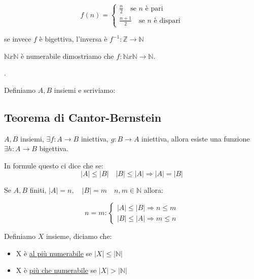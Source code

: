 \documentclass{article}
\begin{document}
\[
f(n) =
\begin{cases}
        \frac{n}{2} \quad \mbox{se $n$ è pari} \\
        \frac{n + 1}{2} \quad \mbox{se $n$ è dispari}
\end{cases}
\]

se invece $f$ è bigettiva, l'inversa è $f^{-1}: \mathbb{Z} \to \mathbb{N}$


$\mathbb{N} x \mathbb{N}$ è numerabile dimostriamo che $f: \mathbb{N} x \mathbb{N} \to \mathbb{N}$.

.

Definiamo $A,B$ insiemi e scriviamo: 



\subsection{Teorema di Cantor-Bernstein}
$A,B$ insiemi, $\exists f : A \to B$ iniettiva, $g: B \to A$ iniettiva, allora esiste una funzione $\exists h: A \to B$ bigettiva. \par
In formule questo ci dice che se:
\begin{equation}
        |A| \le |B| \quad |B| \le |A| \Rightarrow |A| = |B|
\end{equation} \newline

Se $A,B$ finiti, $|A| = n, \quad |B|= m \quad n,m \in \mathbb{N}$ allora: 

\[n=m :
\begin{cases}
        |A| \le |B| \Rightarrow n \le m \\
        |B| \le |A| \Rightarrow m \le n
\end{cases}
\]


Definiamo $X$ insieme, diciamo che:
\begin{itemize}
        \item X è \underline{al più numerabile} se $|X| \le |\mathbb{N}|$	
        \item X è \underline{più che numerabile} se $|X| > |\mathbb{N}|$
\end{itemize}
\end{document}
